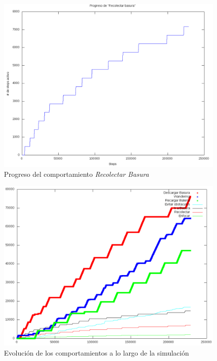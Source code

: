 \begin{figure}[htp]
\begin{center}
\includegraphics[scale=0.3]{comportamientos/graphics/CollectUse.png}
\caption{Progreso del comportamiento \emph{Recolectar Basura}}
\label{fig:collectEvolution}
\end{center}
\end{figure}

\begin{figure}[htp]
\begin{center}
\includegraphics[scale=0.3]{comportamientos/graphics/AllUse.png}
\caption{Evoluci\'on de los comportamientos a lo largo de la simulaci\'on}
\label{fig:behaviourEvolution}
\end{center}
\end{figure}


